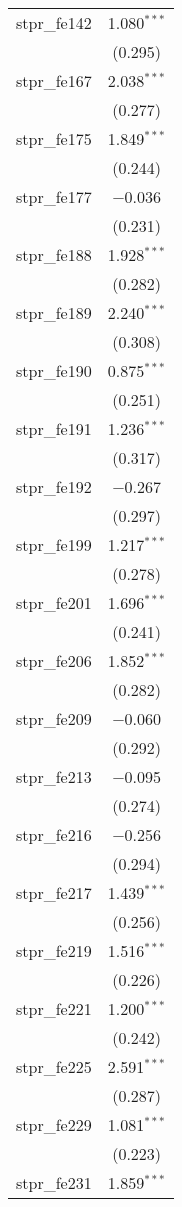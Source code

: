 \begin{table}[!htbp]
\begin{tabular}{@{\extracolsep{5pt}}lc}
  stpr\_fe142 & 1.080$^{***}$ \\ 
  & (0.295) \\ 
  stpr\_fe167 & 2.038$^{***}$ \\ 
  & (0.277) \\ 
  stpr\_fe175 & 1.849$^{***}$ \\ 
  & (0.244) \\ 
  stpr\_fe177 & $-$0.036 \\ 
  & (0.231) \\ 
  stpr\_fe188 & 1.928$^{***}$ \\ 
  & (0.282) \\ 
  stpr\_fe189 & 2.240$^{***}$ \\ 
  & (0.308) \\ 
  stpr\_fe190 & 0.875$^{***}$ \\ 
  & (0.251) \\ 
  stpr\_fe191 & 1.236$^{***}$ \\ 
  & (0.317) \\ 
  stpr\_fe192 & $-$0.267 \\ 
  & (0.297) \\ 
  stpr\_fe199 & 1.217$^{***}$ \\ 
  & (0.278) \\ 
  stpr\_fe201 & 1.696$^{***}$ \\ 
  & (0.241) \\ 
  stpr\_fe206 & 1.852$^{***}$ \\ 
  & (0.282) \\ 
  stpr\_fe209 & $-$0.060 \\ 
  & (0.292) \\ 
  stpr\_fe213 & $-$0.095 \\ 
  & (0.274) \\ 
  stpr\_fe216 & $-$0.256 \\ 
  & (0.294) \\ 
  stpr\_fe217 & 1.439$^{***}$ \\ 
  & (0.256) \\ 
  stpr\_fe219 & 1.516$^{***}$ \\ 
  & (0.226) \\ 
  stpr\_fe221 & 1.200$^{***}$ \\ 
  & (0.242) \\ 
  stpr\_fe225 & 2.591$^{***}$ \\ 
  & (0.287) \\ 
  stpr\_fe229 & 1.081$^{***}$ \\ 
  & (0.223) \\ 
  stpr\_fe231 & 1.859$^{***}$ \\ 

\end{tabular}
\end{table}
